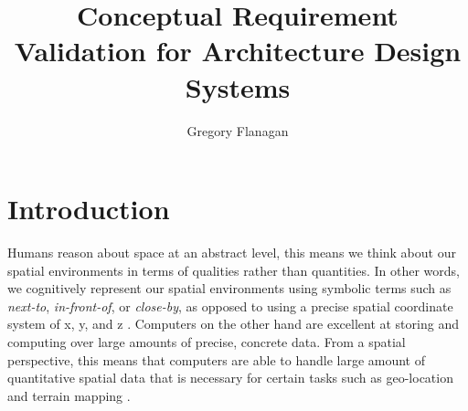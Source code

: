\documentclass[12pt]{ucthesis}
\begin{document}

\title{Conceptual Requirement Validation for Architecture Design Systems}
\author{Gregory Flanagan}
  
 
     



\maketitle

\begin{frontmatter}

\copyrightpage

\committeemembershippage

\begin{abstract}
 



\end{abstract}





\tableofcontents


\listoftables

\listoffigures

\end{frontmatter}

\pagestyle{plain}




\renewcommand{\baselinestretch}{1.66}







\chapter{Introduction}
\label{intro}
Humans reason about space at an abstract level, this means we think about our spatial environments in terms of qualities rather than quantities. In other words, we cognitively represent our spatial environments using symbolic terms such as \emph{next-to}, \emph{in-front-of}, or \emph{close-by}, as opposed to using a precise spatial coordinate system of x, y, and z  \cite{freksa1991qsr} \cite{Cohn:2001:QSR}. Computers on the other hand are excellent at storing and computing over large amounts of precise, concrete data. From a spatial perspective, this means that computers are able to handle large amount of quantitative spatial data that is necessary for certain tasks such as geo-location and terrain mapping \cite{somebody}. 
\end{document}
